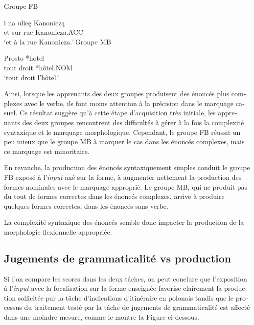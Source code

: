\documentclass[output=paper]{langscibook}
\begin{document}
\begin{otherlanguage}{french}
\ea%
    \label{ex:watorek:11}

           Groupe FB

\gll i   na   ulicę   Kanoniczą\\
 et   sur   rue   Kanonicza.ACC\\
\glt ‘et à la rue Kanonicza.’
\ex%
    \label{ex:watorek:12}
          Groupe MB

\gll *Prosto  *hotel\\
 {tout droit}   *hôtel.NOM\\
\glt ‘tout droit l’hôtel.’
\z\largerpage

Ainsi, lorsque les apprenants des deux groupes produisent des énoncés plus complexes avec le verbe, ils font moins attention à la précision dans le marquage casuel. Ce résultat suggère qu’à cette étape d’acquisition très initiale, les apprenants des deux groupes rencontrent des difficultés à gérer à la fois la complexité syntaxique et le marquage morphologique. Cependant, le groupe FB réussit un peu mieux que le groupe MB à marquer le cas dans les énoncés complexes, mais ce marquage est minoritaire.

En revanche, la production des énoncés syntaxiquement simples conduit le groupe FB exposé à l’\textit{input} axé sur la forme, à augmenter nettement la production des formes nominales avec le marquage approprié. Le groupe MB, qui ne produit pas du tout de formes correctes dans les énoncés complexes, arrive à produire quelques formes correctes, dans les énoncés sans verbe. 

La complexité syntaxique des énoncés semble donc impacter la production de la morphologie flexionnelle appropriée.

\subsection{Jugements de grammaticalité vs production}\label{sec:watorek:5.3}

Si l’on compare les scores dans les deux tâches, on peut conclure que l’exposition à l’\textit{input} avec la focalisation sur la forme enseignée favorise clairement la production sollicitée par la tâche d’indications d’itinéraire en polonais tandis que le processus du traitement testé par la tâche de jugements de grammaticalité est affecté dans une moindre mesure, comme le montre la Figure ci-dessous.


\end{otherlanguage}
\end{document}

